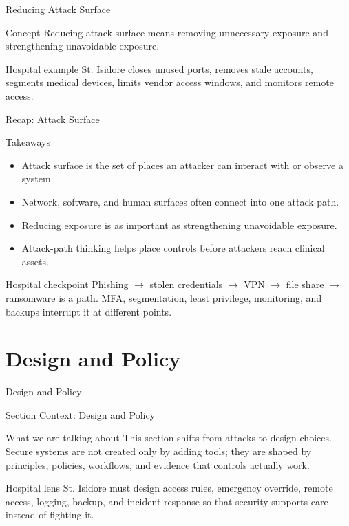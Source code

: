 \documentclass[presentation]{beamer}
\newcommand{\sectiontitleframe}[1]{
\begin{frame}[plain,c]
\begin{center}
{\usebeamerfont{title}\usebeamercolor[fg]{title}#1}
\end{center}
\end{frame}
}
\begin{document}
\begin{frame}[c]{Reducing Attack Surface}
\begin{block}{Concept}
Reducing attack surface means removing unnecessary exposure and strengthening unavoidable
exposure.
\end{block}

\begin{exampleblock}{Hospital example}
St. Isidore closes unused ports, removes stale accounts, segments medical devices, limits vendor
access windows, and monitors remote access.
\end{exampleblock}
\end{frame}

\begin{frame}[c]{Recap: Attack Surface}
\begin{block}{Takeaways}
\begin{itemize}
    \item Attack surface is the set of places an attacker can interact with or observe a system.
    \item Network, software, and human surfaces often connect into one attack path.
    \item Reducing exposure is as important as strengthening unavoidable exposure.
    \item Attack-path thinking helps place controls before attackers reach clinical assets.
\end{itemize}
\end{block}

\begin{exampleblock}{Hospital checkpoint}
Phishing $\rightarrow$ stolen credentials $\rightarrow$ VPN $\rightarrow$ file share
$\rightarrow$ ransomware is a path. MFA, segmentation, least privilege, monitoring, and backups
interrupt it at different points.
\end{exampleblock}
\end{frame}

\section{Design and Policy}
\sectiontitleframe{Design and Policy}

\begin{frame}[c]{Section Context: Design and Policy}
\begin{block}{What we are talking about}
This section shifts from attacks to design choices. Secure systems are not created only by adding
tools; they are shaped by principles, policies, workflows, and evidence that controls actually work.
\end{block}

\begin{exampleblock}{Hospital lens}
St. Isidore must design access rules, emergency override, remote access, logging, backup, and
incident response so that security supports care instead of fighting it.
\end{exampleblock}
\end{frame}
\end{document}

